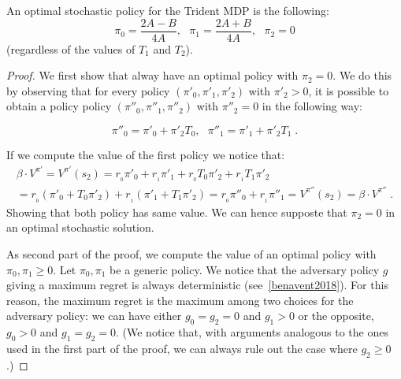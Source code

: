 \begin{proposition}\label{theorem:opt_stoc}
An optimal stochastic policy  for the Trident MDP is the following:
$$\pi_{0}=\dfrac{2A - B}{4A},~~~\pi_{1}=\dfrac{2A + B}{4A}, ~~~\pi_2 = 0$$
(regardless of the values of $T_1$ and $T_2$).
\end{proposition}
\begin{proof}
We first show that alway have an optimal policy with $\pi_2 = 0$. We do this by observing that for every policy $(\pi'_0, \pi'_1, \pi'_2)$ with $\pi'_2 > 0$, it is possible to obtain a policy policy $(\pi''_0, \pi''_1, \pi''_2)$ with $\pi''_2 = 0$ in the following way:

$$\pi''_0 = \pi'_0 + \pi'_2 T_0, ~~~ \pi''_1 = \pi'_1 + \pi'_2 T_1\;.$$

If we compute the value of the first policy we notice that:
\begin{align*}
\beta \cdot V^{\pi'} = V^{\pi'}(s_2) =
r_{_0} \pi'_0 + r_{_1}\pi'_1 + r_{_0} T_0 \pi'_2 + r_{_1} T_1 \pi'_2 \\
= r_{_0} (\pi'_0 + T_0 \pi'_2) + r_{_1} (\pi'_1 + T_1 \pi'_2)
= r_{_0} \pi''_0 + r_{_1}\pi''_1 = V^{\pi''}(s_2) =\beta \cdot V^{\pi''}\;.
\end{align*}
Showing that both policy has same value. We can hence supposte that $\pi_2 =0$ in an optimal stochastic solution.

As second part of the proof, we compute the value of an optimal policy with $\pi_0, \pi_1 \geq 0$.
Let $\pi_0,\pi_1$ be a generic policy. We notice that the adversary policy $g$ giving a maximum regret  is always deterministic (see~\ref{benavent2018}). For this reason, the maximum regret is the maximum among two choices for the adversary policy: we can have either $g_0=g_2=0$ and $g_1 > 0$ or the opposite, $g_0>0$ and $g_1=g_2 = 0$. (We notice that, with arguments analogous to the ones used in the first part of the proof, we can always rule out the case where $g_2 \geq 0$.)


\end{proof}
